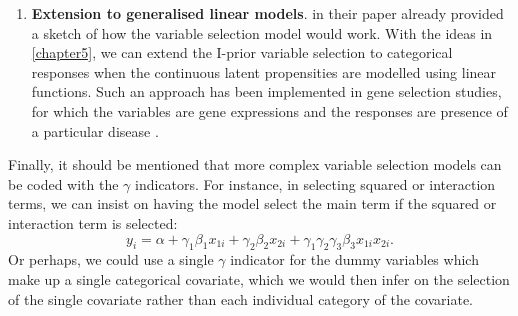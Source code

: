 \documentclass[showframe,11pt,twoside,openright]{report}
\begin{document}
\begin{enumerate}
  \item \textbf{Extension to generalised linear models}.
  \citet{Kuo1998} in their paper already provided a sketch of how the variable selection model would work.
  With the ideas in \cref{chapter5}, we can extend the I-prior variable selection to categorical responses when the continuous latent propensities are modelled using linear functions.
  Such an approach has been implemented in gene selection studies, for which the variables are gene expressions and the responses are presence of a particular disease \citep{lee2003gene}.
\end{enumerate}

Finally, it should be mentioned that more complex variable selection models can be coded with the $\gamma$ indicators.
For instance, in selecting squared or interaction terms, we can insist on having the model select the main term if the squared or interaction term is selected:
\[
  y_i = \alpha + \gamma_1 \beta_1 x_{1i} + \gamma_2 \beta_2 x_{2i} + \gamma_1 \gamma_2\gamma_3 \beta_3 x_{1i}x_{2i}.
\]
Or perhaps, we could use a single $\gamma$ indicator for the dummy variables which make up a single categorical covariate, which we would then infer on the selection of the single covariate rather than each individual category of the covariate.



\hClosingStuffStandalone
\end{document}
